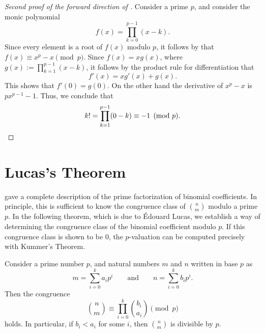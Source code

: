 \begin{proof}[Second proof of the forward direction of ] Consider a prime $p$, and consider the monic polynomial \begin{equation*} f(x)=\prod_{k=0}^{p-1}(x-k). \end{equation*} Since every element is a root of $f(x)$ modulo $p$, it follows by  that $f(x)\equiv x^p-x\pmod{p}$. Since $f(x)=x g(x)$, where $g(x):=\prod_{k=1}^{p-1}(x-k)$, it follows by the product rule for differentiation that \begin{equation*} f'(x)=xg'(x)+g(x). \end{equation*} This shows that $f'(0)=g(0)$. On the other hand the derivative of $x^p-x$ is $p x^{p-1}-1$. Thus, we conclude that \begin{equation*} k!=\prod_{k=1}^{p-1}(0-k)\equiv -1\pmod{p}.\qedhere \end{equation*} \end{proof}

\section{Lucas's Theorem}

 gave a complete description of the prime factorization of binomial coefficients. In principle, this is sufficient to know the congruence class of $\binom{n}{m}$ modulo a prime $p$. In the following theorem, which is due to \'Edouard Lucas, we establish a way of determining the congruence class of the binomial coefficient modulo $p$. If this congruence class is shown to be $0$, the $p$-valuation can be computed precisely with Kummer's Theorem.

\begin{theorem}
  Consider a prime number $p$, and natural numbers $m$ and $n$ written in base $p$ as
  \begin{equation*}
    m=\sum_{i=0}^ka_ip^i\qquad\text{and}\qquad n=\sum_{i=0}^kb_ip^i.
  \end{equation*}
  Then the congruence
  \begin{equation*}
    \binom{n}{m}\equiv\prod_{i=0}^k\binom{b_i}{a_i}\pmod{p}
  \end{equation*}
  holds. In particular, if $b_i<a_i$ for some $i$, then $\binom{n}{m}$ is divisible by $p$.
\end{theorem}

